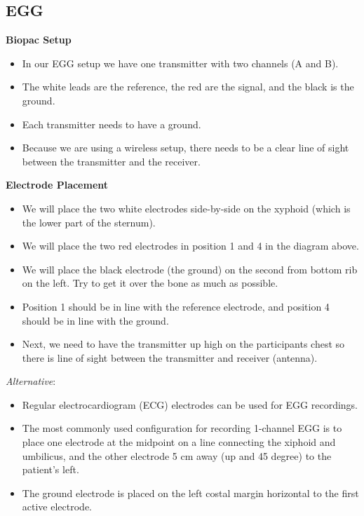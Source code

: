 \documentclass[]{book}
\providecommand{\tightlist}{%
  \setlength{\itemsep}{0pt}\setlength{\parskip}{0pt}}
\begin{document}
\hypertarget{egg}{%
\subsection{EGG}\label{egg}}

\textbf{Biopac Setup}

\begin{itemize}
\tightlist
\item
  In our EGG setup we have one transmitter with two channels (A and B).
\item
  The white leads are the reference, the red are the signal, and the black is the ground.
\item
  Each transmitter needs to have a ground.
\item
  Because we are using a wireless setup, there needs to be a clear line of sight between the transmitter and the receiver.
\end{itemize}

\textbf{Electrode Placement}

\begin{itemize}
\tightlist
\item
  We will place the two white electrodes side-by-side on the xyphoid (which is the lower part of the sternum).
\item
  We will place the two red electrodes in position 1 and 4 in the diagram above.
\item
  We will place the black electrode (the ground) on the second from bottom rib on the left. Try to get it over the bone as much as possible.
\item
  Position 1 should be in line with the reference electrode, and position 4 should be in line with the ground.
\item
  Next, we need to have the transmitter up high on the participants chest so there is line of sight between the transmitter and receiver (antenna).
\end{itemize}

\emph{Alternative}:

\begin{itemize}
\tightlist
\item
  Regular electrocardiogram (ECG) electrodes can be used for EGG recordings.
\item
  The most commonly used configuration for recording 1-channel EGG is to place one electrode at the midpoint on a line connecting the xiphoid and umbilicus, and the other electrode 5 cm away (up and 45 degree) to the patient's left.
\item
  The ground electrode is placed on the left costal margin horizontal to the first active electrode.
\end{itemize}
\end{document}
